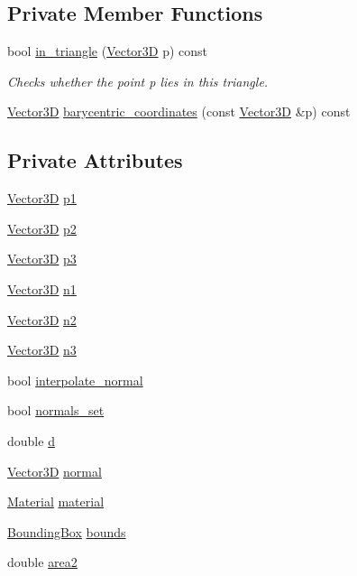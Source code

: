 \subsection*{Private Member Functions}
\begin{DoxyCompactItemize}
\item 
bool \mbox{\hyperlink{classTriangle_a77b65e645ea99e309d6a8672e61d488d}{in\+\_\+triangle}} (\mbox{\hyperlink{classVector3D}{Vector3D}} p) const
\begin{DoxyCompactList}\small\item\em Checks whether the point p lies in this triangle. \end{DoxyCompactList}\item 
\mbox{\hyperlink{classVector3D}{Vector3D}} \mbox{\hyperlink{classTriangle_ab1f861b8e31d8560cf80c58e4dbf560f}{barycentric\+\_\+coordinates}} (const \mbox{\hyperlink{classVector3D}{Vector3D}} \&p) const
\end{DoxyCompactItemize}
\subsection*{Private Attributes}
\begin{DoxyCompactItemize}
\item 
\mbox{\hyperlink{classVector3D}{Vector3D}} \mbox{\hyperlink{classTriangle_a0461ba6ca1a0e1aa84062f93eacbe8b8}{p1}}
\item 
\mbox{\hyperlink{classVector3D}{Vector3D}} \mbox{\hyperlink{classTriangle_aa15acbc4f123f3e9e75e574566c2679a}{p2}}
\item 
\mbox{\hyperlink{classVector3D}{Vector3D}} \mbox{\hyperlink{classTriangle_a600c7366c1dad8996026742eb12434c6}{p3}}
\item 
\mbox{\hyperlink{classVector3D}{Vector3D}} \mbox{\hyperlink{classTriangle_a51a16cfc88994c78e31340029bac777f}{n1}}
\item 
\mbox{\hyperlink{classVector3D}{Vector3D}} \mbox{\hyperlink{classTriangle_ab5786d87c9f548c1e8bb5937977dd0af}{n2}}
\item 
\mbox{\hyperlink{classVector3D}{Vector3D}} \mbox{\hyperlink{classTriangle_ae91046acca032af6fb931497127f8a7e}{n3}}
\item 
bool \mbox{\hyperlink{classTriangle_ac0fad333557f59ba9d9cafb8c16b203a}{interpolate\+\_\+normal}}
\item 
bool \mbox{\hyperlink{classTriangle_a8c739e7a19f4628c9fa5e0027a32b5a9}{normals\+\_\+set}}
\item 
double \mbox{\hyperlink{classTriangle_a0cb5b18a8ce2cf896712cd3f9e6c80ea}{d}}
\item 
\mbox{\hyperlink{classVector3D}{Vector3D}} \mbox{\hyperlink{classTriangle_ac6e29ae9d1f7abc16cfb25357c74806f}{normal}}
\item 
\mbox{\hyperlink{classMaterial}{Material}} \mbox{\hyperlink{classTriangle_ae170999b9b35d778d9a0d084d256547b}{material}}
\item 
\mbox{\hyperlink{classBoundingBox}{Bounding\+Box}} \mbox{\hyperlink{classTriangle_ac5b18fe5f9ea12fb717e3306c300527d}{bounds}}
\item 
double \mbox{\hyperlink{classTriangle_a43322fb75910877dd63b17d391e3022b}{area2}}
\end{DoxyCompactItemize}


